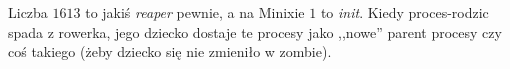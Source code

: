 Liczba \(1613\) to jakiś \textit{reaper} pewnie, a na Minixie \(1\) to \textit{init}. Kiedy proces-rodzic spada z rowerka, jego dziecko dostaje te procesy jako ,,nowe'' parent procesy czy coś takiego (żeby dziecko się nie zmieniło w zombie). 